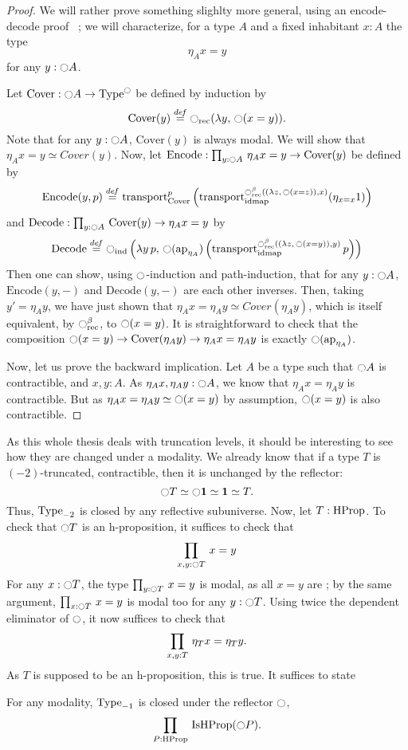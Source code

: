 \begin{proof}
  We will rather prove something slighlty more general, using an
  encode-decode proof~\cite[Section 8.9]{hottbook} ; we will
  characterize, for a type $A$ and a fixed inhabitant $x:A$ the type 
  \[ \eta_A x = y \] 
  for any $y:\ocircle A$.
  
  \newcommand{\Cover}{\mathrm{Cover}}
  \newcommand{\Encode}{\mathrm{Encode}}
  \newcommand{\Decode}{\mathrm{Decode}}
  Let $\Cover:\modal A \to \Type^\modal$ be defined by induction by
  \[ \Cover(y) \defeq \modal_{\mathrm{rec}} (\lambda y,\,\modal (x =
    y)). \]
  Note that for any $y:\ocircle A$, $\Cover(y)$ is always modal.
  We will show that $\eta_A x = y \simeq Cover(y)$.
  Now, let $\Encode : \prodD y {\modal A} {\eta_A x = y \to
    \Cover(y)}$ be defined by
  \[ \Encode(y,p) \defeq \transport_{\Cover}^p
    \left(\transport_{\idmap}^{\modal_{\mathrm{rec}}^\beta ((\lambda
        z,\,\modal (x = z)), x)} (\eta_{x=x} 1)\right) \]
  and $\Decode:\prodD y {\modal A} {\Cover(y) \to \eta_A x = y}$ by
  \[
    \Decode \defeq \modal_{\mathrm{ind}} \left(\lambda y\,p,\,
    \modal(\ap{\eta_A})  \left(\transport_{\idmap}^{\modal_{\mathrm{rec}}^\beta ((\lambda
        z,\,\modal (x = y)),y)} p\right)\right)
  \]
  Then one can show, using $\ocircle$-induction and path-induction, that
  for any $y:\ocircle A$, $\Encode(y,-)$ and $\Decode(y,-)$
  are each other inverses. Then, taking $y' = \eta_A y$, we have just
  shown that $\eta_A x = \eta_A y \simeq Cover(\eta_A y)$, which is
  itself equivalent, by $\ocircle_{\mathrm{rec}}^\beta$, to $\ocircle
  (x=y)$.
  It is straightforward to check that the composition $\modal (x=y)
  \to \Cover(\eta_A y) \to \eta_A x = \eta_A y$ is exactly $\ocircle
  (\mathrm{ap}_{\eta_A})$.
  
  Now, let us prove the backward implication. Let $A$ be a type such
  that $\ocircle A$ is contractible, and $x,y:A$. 
  As $\eta_A x,\eta_A y: \ocircle A$, we know that $\eta_A x = \eta_A y$
  is contractible. But as $\eta_A x = \eta_A y \simeq \ocircle (x=y)$ by
  assumption, $\ocircle (x=y)$ is also contractible.
\end{proof}

As this whole thesis deals with truncation levels, it should be
interesting to see how they are changed under a modality. 
We already know that if a type $T$ is $(-2)$-truncated, \ie{}
contractible, then it is unchanged by the reflector: \[\ocircle T \simeq
\ocircle \mathbf{1} \simeq \mathbf{1} \simeq T.\] Thus, $\operatorname{Type}_{-2}$ is closed by
any reflective subuniverse.
%
Now, let $T:\operatorname{HProp}$. To check that $\ocircle T$ is an h-proposition, it
suffices to check that \[\prod_{x,y:\ocircle T}\, x = y\] 
For any $x:\ocircle T$, the type $\prod_{y:\ocircle T}\, x = y$
is modal, as all $x=y$ are ; by the same argument, $\prod_{x:\ocircle T}\, x =
  y$ is modal too for any $y:\ocircle T$. 
Using twice the dependent eliminator of $\ocircle$, it now suffices to
check that \[\prod_{x,y:T}\, \eta_T x = \eta_T y.\]
As $T$ is supposed to be an h-proposition, this is true. It suffices
to state
\begin{lem}\label{lem:mod-hprop}
  For any modality, $\operatorname{Type}_{-1}$ is closed under the reflector
  $\ocircle$, \ie{} \[\prod_{P:\operatorname{HProp}}\, \operatorname{IsHProp} (\ocircle P).\]
\end{lem}

